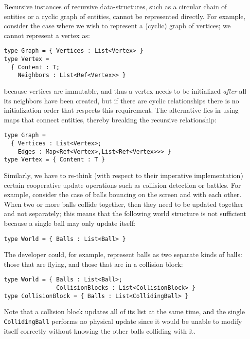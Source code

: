 Recursive instances of recursive data-structures, such as a circular chain of entities or a cyclic graph of entities, cannot be represented directly. For example, consider the case where we wish to represent a (cyclic) graph of vertices; we cannot represent a vertex as:

\begin{lstlisting}
type Graph = { Vertices : List<Vertex> }
type Vertex = 
  { Content : T; 
    Neighbors : List<Ref<Vertex>> }
\end{lstlisting}

because vertices are immutable, and thus a vertex needs to be initialized \textit{after} all its neighbors have been created, but if there are cyclic relationships there is no initialization order that respects this requirement. The alternative lies in using maps that connect entities, thereby breaking the recursive relationship:

\begin{lstlisting}
type Graph = 
  { Vertices : List<Vertex>; 
    Edges : Map<Ref<Vertex>,List<Ref<Vertex>>> }
type Vertex = { Content : T }
\end{lstlisting}

Similarly, we have to re-think (with respect to their imperative implementation) certain cooperative update operations such as collision detection or battles. For example, consider the case of balls bouncing on the screen and with each other. When two or more balls collide together, then they need to be updated together and not separately; this means that the following world structure is not sufficient because a single ball may only update itself:

\begin{lstlisting}
type World = { Balls : List<Ball> }
\end{lstlisting}

The developer could, for example, represent balls as two separate kinds of balls: those that are flying, and those that are in a collision block:

\begin{lstlisting}
type World = { Balls : List<Ball>; 
               CollisionBlocks : List<CollisionBlock> }
type CollisionBlock = { Balls : List<CollidingBall> }
\end{lstlisting}

Note that a collision block updates all of its list at the same time, and the single \texttt{CollidingBall} performs no physical update since it would be unable to modify itself correctly without knowing the other balls colliding with it.

